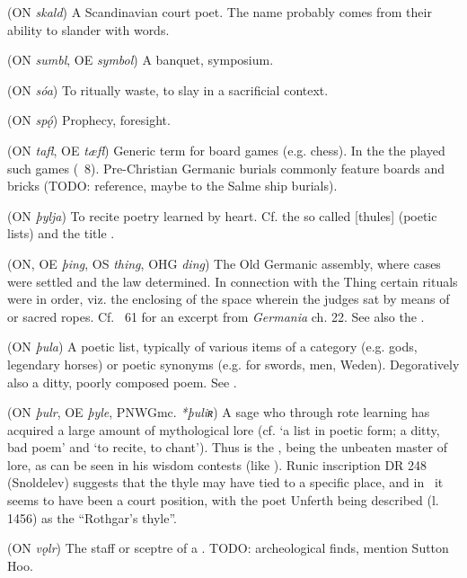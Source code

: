 \begin{itemize}
 (ON \emph{skald})
  A Scandinavian court poet.  The name probably comes from their ability to slander with words.

 (ON \emph{sumbl}, OE \emph{symbol})
  A banquet, symposium.

 (ON \emph{sóa})
  To ritually waste, to slay in a sacrificial context.

 (ON \emph{spǫ́})
  Prophecy, foresight.

 (ON \emph{tafl}, OE \emph{tæfl})
  Generic term for board games (e.g. chess).  In the  the  played such games (\Voluspa\ 8).  Pre-Christian Germanic burials commonly feature boards and bricks (TODO: reference, maybe to the Salme ship burials).

 (ON \emph{þylja})
  To recite poetry learned by heart.  Cf. the so called [thules] (poetic lists) and the title .

 (ON, OE \emph{þing}, OS \emph{thing}, OHG \emph{ding})
  The Old Germanic assembly, where cases were settled and the law determined.  In connection with the Thing certain rituals were in order, viz. the enclosing of the space wherein the judges sat by means of  or sacred ropes.  Cf. \Havamal\ 61 for an excerpt from \emph{Germania} ch. 22.  See also the .

 (ON \emph{þula})
  A poetic list, typically of various items of a category (e.g. gods, legendary horses) or poetic synonyms (e.g. for swords, men, Weden). Degoratively also a ditty, poorly composed poem. See .

 (ON \emph{þulr}, OE \emph{þyle}, PNWGmc. \emph{*þuliʀ})
  A sage who through rote learning has acquired a large amount of mythological lore (cf.  ‘a list in poetic form; a ditty, bad poem’ and  ‘to recite, to chant’).  Thus  is the , being the unbeaten master of lore, as can be seen in his wisdom contests (like \Vafthrudnismal).  Runic inscription DR 248 (Snoldelev) suggests that the thyle may have tied to a specific place, and in \Beowulf\ it seems to have been a court position, with the poet Unferth being described (l. 1456) as the “Rothgar’s thyle”.

 (ON \emph{vǫlr})
  The staff or sceptre of a .  TODO: archeological finds, mention Sutton Hoo.


\end{itemize}
